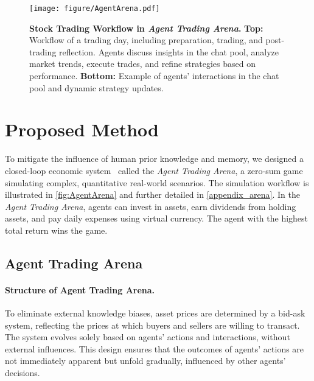 
\begin{figure*}
	\centering
	\texttt{[image: figure/AgentArena.pdf]}
	\caption{\textbf{Stock Trading Workflow in \textit{Agent Trading Arena}.} 
	\textbf{Top:} Workflow of a trading day, including preparation, trading, and post-trading reflection. Agents discuss insights in the chat pool, analyze market trends, execute trades, and refine strategies based on performance.  
	\textbf{Bottom:} Example of agents' interactions in the chat pool and dynamic strategy updates.}
	\label{fig:AgentArena}
	\vspace{-3pt}
\end{figure*}

\section{Proposed Method}


To mitigate the influence of human prior knowledge and memory, we designed a closed-loop economic system~\citep{guo2024economics} called the \textit{Agent Trading Arena}, a zero-sum game simulating complex, quantitative real-world scenarios. The simulation workflow is illustrated in \autoref{fig:AgentArena} and further detailed in \autoref{appendix_arena}. In the \textit{Agent Trading Arena}, agents can invest in assets, earn dividends from holding assets, and pay daily expenses using virtual currency. The agent with the highest total return wins the game.

\subsection{Agent Trading Arena}

\paragraph{Structure of Agent Trading Arena.} 

To eliminate external knowledge biases, asset prices are determined by a bid-ask system, reflecting the prices at which buyers and sellers are willing to transact. The system evolves solely based on agents' actions and interactions, without external influences. This design ensures that the outcomes of agents' actions are not immediately apparent but unfold gradually, influenced by other agents' decisions.


